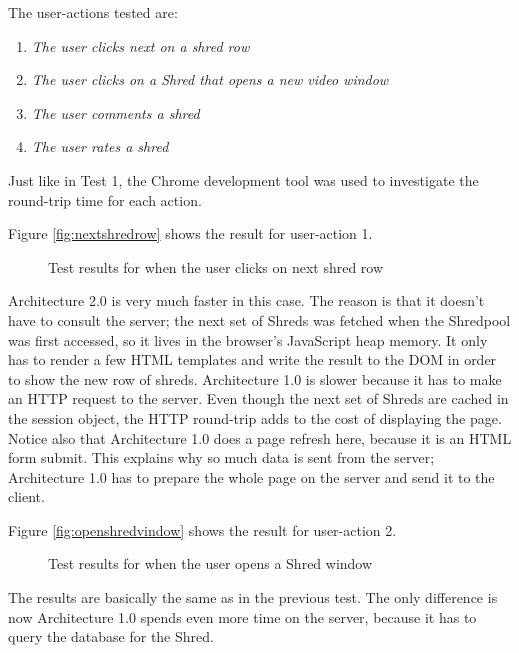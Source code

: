 The user-actions tested are:
\begin{enumerate}
\item \textit{The user clicks next on a shred row}
\item \textit{The user clicks on a Shred that opens a new video window}
\item \textit{The user comments a shred}
\item \textit{The user rates a shred}
\end{enumerate}
Just like in Test 1, the Chrome development tool was used to investigate the round-trip time for each action. 

Figure \vref{fig:nextshredrow} shows the result for user-action 1. 
\begin{figure}
\begin{center}
\end{center}
\caption{Test results for when the user clicks on next shred row}\label{fig:nextshredrow}
\end{figure}
Architecture 2.0 is very much faster in this case. The reason is that it doesn't have to consult the server; the next set of Shreds was fetched when the Shredpool was first accessed, so it lives in the browser's JavaScript heap memory. It only has to render a few HTML templates and write the result to the DOM in order to show the new row of shreds. Architecture 1.0 is slower because it has to make an HTTP request to the server. Even though the next set of Shreds are cached in the session object, the HTTP round-trip adds to the cost of displaying the page. Notice also that Architecture 1.0 does a page refresh here, because it is an HTML form submit. This explains why so much data is sent from the server; Architecture 1.0 has to prepare the whole page on the server and send it to the client.

Figure \vref{fig:openshredvindow} shows the result for user-action 2. 
\begin{figure}
\begin{center}
\end{center}
\caption{Test results for when the user opens a Shred window}\label{fig:openshredvindow}
\end{figure}
The results are basically the same as in the previous test. The only difference is now Architecture 1.0 spends even more time on the server, because it has to query the database for the Shred.  

